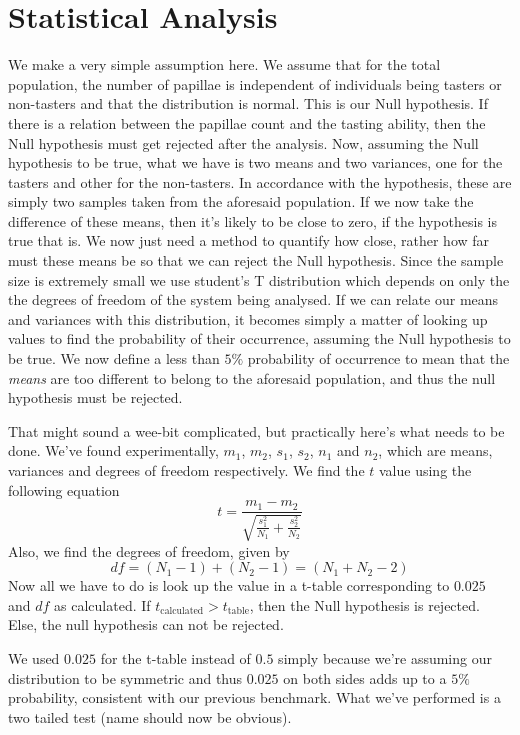 \section{Statistical Analysis}
	We make a very simple assumption here. We assume that for the total population, the number of papillae is independent of individuals being tasters or non-tasters and that the distribution is normal. This is our Null hypothesis. If there is a relation between the papillae count and the tasting ability, then the Null hypothesis must get rejected after the analysis. Now, assuming the Null hypothesis to be true, what we have is two means and two variances, one for the tasters and other for the non-tasters. In accordance with the hypothesis, these are simply two samples taken from the aforesaid population. If we now take the difference of these means, then it's likely to be close to zero, if the hypothesis is true that is. We now just need a method to quantify how close, rather how far must these means be so that we can reject the Null hypothesis. Since the sample size is extremely small we use student's T distribution which depends on only the the degrees of freedom of the system being analysed. If we can relate our means and variances with this distribution, it becomes simply a matter of looking up values to find the probability of their occurrence, assuming the Null hypothesis to be true. We now define a less than $5\%$ probability of occurrence to mean that the \emph{means} are too different to belong to the aforesaid population, and thus the null hypothesis must be rejected.
	\par
	That might sound a wee-bit complicated, but practically here's what needs to be done. We've found experimentally, $m_1$, $m_2$, $s_1$, $s_2$, $n_1$ and $n_2$, which are means, variances and degrees of freedom respectively. We find the $t$ value using the following equation
	\begin{equation}
		t=\frac{m_1 - m_2}{\sqrt{\frac{s_1^2}{N_1} + \frac{s_2^2}{N_2}}}
	\end{equation}
	Also, we find the degrees of freedom, given by
	\begin{equation}
		df = (N_1 -1) + (N_2 -1) = (N_1 + N_2 -2)
	\end{equation}
	Now all we have to do is look up the value in a t-table corresponding to $0.025$ and $df$ as calculated. If $t_\text{calculated}>t_\text{table}$, then the Null hypothesis is rejected. Else, the null hypothesis can not be rejected.
	\par
	We used $0.025$ for the t-table instead of $0.5$ simply because we're assuming our distribution to be symmetric and thus $0.025$ on both sides adds up to a $5\%$ probability, consistent with our previous benchmark. What we've performed is a two tailed test (name should now be obvious).

